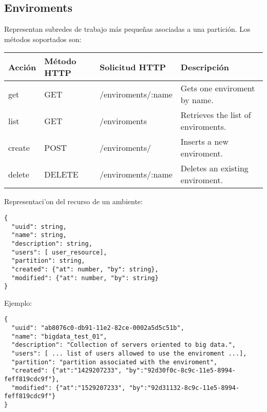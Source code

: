 \subsection{Enviroments}
Representan subredes de trabajo más pequeñas asociadas a una partición. Los métodos soportados son:

\begin{center}
 \begin{tabular}{| l | l | l | l |}
 \hline
  \rowcolor{blueapi}
  \textbf{Acción} & \textbf{Método HTTP} & \textbf{Solicitud HTTP} & \textbf{Descripción} \\ [0.5ex] 
  \hline\hline
  get & GET & /enviroments/:name & Gets one enviroment by name. \\
  \hline
  list & GET & /enviroments & \pbox{5cm}{\vspace{0.2cm} Retrieves the list of \\ enviroments. \vspace{0.2cm}} \\
  \hline  
  create & POST & /enviroments/ & Inserts a new enviroment. \\
  \hline
  delete & DELETE & /enviroments/:name & Deletes an existing enviroment. \\
  \hline
\end{tabular}
\end{center}

Representaci'on del recurso de un ambiente:

\medskip
\begin{lstlisting}[style=json]
{
  "uuid": string,
  "name": string,
  "description": string, 
  "users": [ user_resource],
  "partition": string,
  "created": {"at": number, "by": string},
  "modified": {"at": number, "by": string}
}
\end{lstlisting}

Ejemplo:

\medskip
\begin{lstlisting}[style=json]
{
  "uuid": "ab8076c0-db91-11e2-82ce-0002a5d5c51b",
  "name": "bigdata_test_01",
  "description": "Collection of servers oriented to big data.", 
  "users": [ ... list of users allowed to use the enviroment ...],
  "partition": "partition associated with the enviroment",
  "created": {"at":"1429207233", "by":"92d30f0c-8c9c-11e5-8994-feff819cdc9f"},
  "modified": {"at":"1529207233", "by":"92d31132-8c9c-11e5-8994-feff819cdc9f"}
}
\end{lstlisting}

